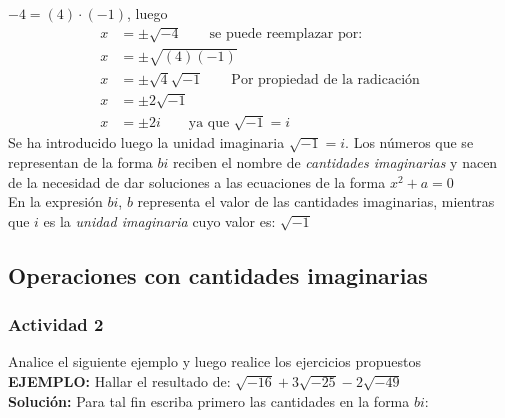 \documentclass[letterpaper,11pt,twoside]{article}
\begin{document}
\begin{multicols}{2}
$ -4=(4)\cdot (-1) $, luego\\
\begin{align*}
  x&=\pm \sqrt{-4} \qquad \text{se puede reemplazar por:}\\
  x&=\pm \sqrt{(4)(-1)}\\
  x&=\pm \sqrt{4}\sqrt{-1} \qquad \text{Por propiedad de la radicación}\\
  x&=\pm 2\sqrt{-1}\\
  x&=\pm 2i \qquad \text{ya que }\sqrt{-1}=i  
\end{align*}
Se ha introducido luego la unidad imaginaria \mbox{$ \sqrt{-1}=i $}. Los números que se representan de la forma $ bi $ reciben el nombre de \emph{cantidades imaginarias} y nacen de la necesidad de dar soluciones a las ecuaciones de la forma $ x^2+a=0 $\\

En la expresión $ bi $, $ b $ representa el valor de las cantidades imaginarias, mientras que $ i $ es la \emph{unidad imaginaria} cuyo valor es: $ \sqrt{-1} $
\subsection*{Operaciones con cantidades imaginarias}
\subsubsection*{Actividad 2}
Analice el siguiente ejemplo y luego realice los ejercicios propuestos\\

\textbf{EJEMPLO:} Hallar el resultado de: $ \sqrt{-16}+3\sqrt{-25}-2\sqrt{-49} $\\

\textbf{Solución:} Para tal fin escriba primero las cantidades en la forma $ bi $:


\end{multicols}
\end{document}
